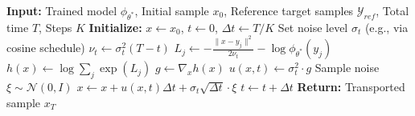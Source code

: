 \documentclass[11pt]{article}
\theoremstyle{remark}
\numberwithin{equation}{section}
\begin{document}
\begin{algorithm}
\caption{Sampling via Learned Continuous Drift}
\begin{algorithmic}[1]
\STATE \textbf{Input:} Trained model $\phi_{\theta^*}$, Initial sample $x_0$, Reference target samples $\mathcal{Y}_{ref}$, Total time $T$, Steps $K$
\STATE \textbf{Initialize:} $x \leftarrow x_0$, $t \leftarrow 0$, $\Delta t \leftarrow T/K$
\STATE
{}
    \STATE Set noise level $\sigma_t$ (e.g., via cosine schedule)
    \STATE $\nu_t \leftarrow \sigma_t^2 (T - t)$
    \STATE
        \STATE $L_j \leftarrow -\frac{\|x - y_j\|^2}{2\nu_t} - \log \phi_{\theta^*}(y_j)$
    \ENDFOR
    \STATE $h(x) \leftarrow \log \sum_j \exp(L_j)$
    \STATE $g \leftarrow \nabla_x h(x)$
    \STATE $u(x,t) \leftarrow \sigma_t^2 \cdot g$
    \STATE
    \STATE Sample noise $\xi \sim \mathcal{N}(0, I)$
    \STATE $x \leftarrow x + u(x,t)\Delta t + \sigma_t \sqrt{\Delta t} \cdot \xi$
    \STATE $t \leftarrow t + \Delta t$
\ENDFOR
\STATE \textbf{Return:} Transported sample $x_T$
\end{algorithmic} \label{code:algo_sample}
\end{algorithm}
\end{document}
